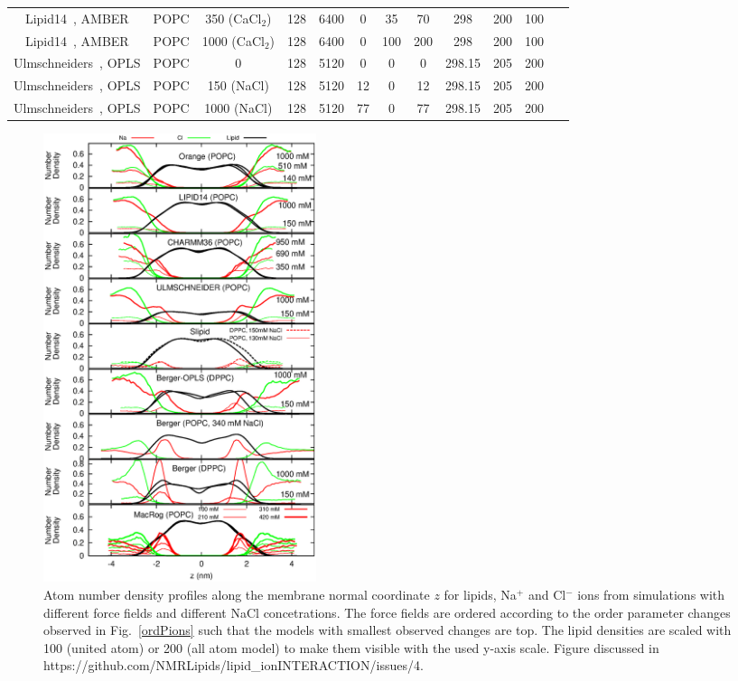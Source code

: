 \documentclass[pre,aps,floatfix,authordate1-4,twocolumn]{revtex4-1}
\begin{document}
\begin{table}[htb]
\begin{tabular}{c c c c c c c c c c c c}
  Lipid14~\cite{dickson14}, AMBER\cite{aqvist90}   &   POPC & 350 (CaCl$_2$) & 128 & 6400 & 0 & 35 & 70 & 298 & 200 & 100 &~\cite{lipid14POPC350mMCaClfiles}  \\
  Lipid14~\cite{dickson14}, AMBER\cite{aqvist90}   &   POPC & 1000 (CaCl$_2$) & 128 & 6400 & 0 & 100 & 200 & 298 & 200 & 100 &~\cite{lipid14POPC1000mMCaClfiles}  \\
  \hline
  Ulmschneiders~\cite{Ulmschneider09}, OPLS\cite{aqvist90}       &   POPC & 0          & 128 & 5120 & 0 & 0  & 0 & 298.15 & 205 & 200 &~\cite{ulmschneiderPOPC0mMNaClfiles}  \\
  Ulmschneiders~\cite{Ulmschneider09}, OPLS\cite{aqvist90}       &   POPC & 150 (NaCl) & 128 & 5120 & 12 & 0  & 12 & 298.15 & 205 & 200 &~\cite{ulmschneiderPOPC150mMNaClfiles}  \\
  Ulmschneiders~\cite{Ulmschneider09}, OPLS\cite{aqvist90}       &   POPC & 1000 (NaCl) & 128 & 5120 & 77 & 0  & 77 & 298.15 & 205 & 200 &~\cite{ulmschneiderPOPC1000mMNaClfiles}  \\
\end{tabular}
\end{table} 
\begin{figure}[]
  \centering
  \includegraphics[width=8cm]{../Fig/NAdensities.eps}
  \caption{\label{NAdensities}
    Atom number density profiles along the membrane normal coordinate $z$ for lipids, Na$^+$ and Cl$^-$ ions from simulations with different force fields and different NaCl concetrations. 
    The force fields are ordered according to the order parameter changes observed in Fig.~\ref{ordPions} such that the models with smallest
    observed changes are top.
    The lipid densities are scaled with 100 (united atom) or 200 (all atom model) to make them visible with the used y-axis scale.
    Figure discussed in https://github.com/NMRLipids/lipid\_ionINTERACTION/issues/4.}
\end{figure}
\end{document}
